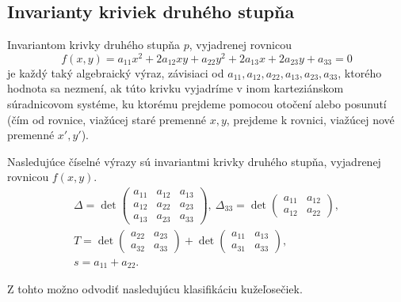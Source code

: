 \subsection{Invarianty kriviek druhého stupňa}
\begin{definition}
Invariantom krivky druhého stupňa $p$, vyjadrenej rovnicou
$$
f(x, y) = a_{11}x^2 + 2a_{12}xy + a_{22}y^2 + 2a_{13}x + 2a_{23}y + a_{33} = 0
$$
je každý taký algebraický výraz, závisiaci od \(a_{11}, a_{12}, a_{22}, a_{13}, a_{23}, a_{33}\), ktorého hodnota sa nezmení, ak túto krivku vyjadríme v inom karteziánskom súradnicovom systéme, ku ktorému prejdeme pomocou otočení alebo posunutí (čím od rovnice, viažúcej staré premenné \(x, y\), prejdeme k rovnici, viažúcej nové premenné \(x', y'\)).
\end{definition}

\begin{theorem}
Nasledujúce číselné výrazy sú invariantmi krivky druhého stupňa, vyjadrenej rovnicou $f(x, y)$.
\begin{gather*}
\Delta = \det \begin{pmatrix} 
a_{11} & a_{12} & a_{13} \\ 
a_{12} & a_{22} & a_{23} \\
a_{13} & a_{23} & a_{33} \end{pmatrix}, \
\Delta_{33} = \det \begin{pmatrix} a_{11} & a_{12} \\ a_{12} & a_{22} \end{pmatrix}, \\
T = \det \begin{pmatrix} 
a_{22} & a_{23} \\
a_{32} & a_{33}  \end{pmatrix} + \det \begin{pmatrix} 
a_{11} & a_{13} \\ 
a_{31} & a_{33} \end{pmatrix}, \\
s = a_{11} + a_{22}.
\end{gather*}
\end{theorem}
Z tohto možno odvodiť nasledujúcu klasifikáciu kužeľosečiek.

